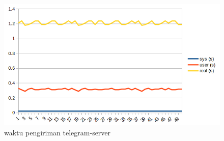 \begin{figure}[H]
	\centering
	\includegraphics[scale=0.7]{gambar/telegram}
	\caption{waktu pengiriman telegram-server}
	\label{waktu pengiriman telegram-server}
\end{figure}

